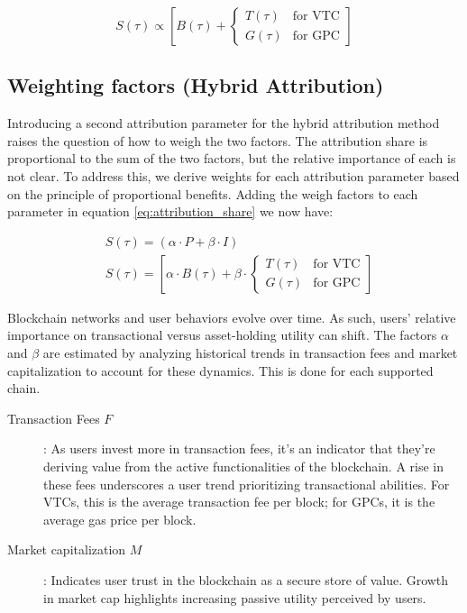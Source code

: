 \documentclass[11pt]{report}
\begin{document}
\begin{equation}
    S(\tau) \propto \left[B(\tau) + \begin{cases}
            T(\tau) & \text{for VTC} \\
            G(\tau) & \text{for GPC}
        \end{cases}\right]
    \label{eq:attribution_share_chain_type}
\end{equation}

\subsection{Weighting factors (Hybrid Attribution) \label{se:weighting_factors}}

Introducing a second attribution parameter for the hybrid attribution method raises the question of how to weigh the two factors. The attribution share is proportional to the sum of the two factors, but the relative importance of each is not clear. To address this, we derive weights for each attribution parameter based on the principle of proportional benefits. Adding the weigh factors to each parameter in equation \ref{eq:attribution_share} we now have:

\begin{align}
     & S(\tau) = (\alpha \cdot P + \beta \cdot I)                                  \\
     & S(\tau) = \left[\alpha \cdot B(\tau) + \beta \cdot \begin{cases}
                                                                  T(\tau) & \text{for VTC} \\
                                                                  G(\tau) & \text{for GPC}
                                                              \end{cases}\right]
    \label{eq:attribution_factors}
\end{align}



Blockchain networks and user behaviors evolve over time. As such, users' relative importance on transactional versus asset-holding utility can shift. The factors $\alpha$ and $\beta$ are estimated by analyzing historical trends in transaction fees and market capitalization to account for these dynamics. This is done for each supported chain.

\begin{description}
    \item[Transaction Fees $F$]: As users invest more in transaction fees, it's an indicator that they're deriving value from the active functionalities of the blockchain. A rise in these fees underscores a user trend prioritizing transactional abilities. For \ac{VTC}s, this is the average transaction fee per block; for \ac{GPC}s, it is the average gas price per block.
    \item[Market capitalization $M$]: Indicates user trust in the blockchain as a secure store of value. Growth in market cap highlights increasing passive utility perceived by users.
\end{description}
\end{document}
